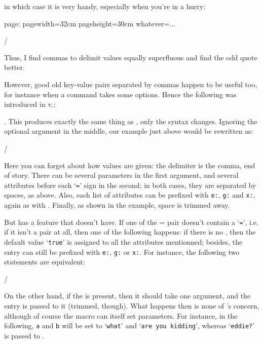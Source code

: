 \noindent in which case it is very handy, especially when you're in a hurry:

\example
\setparameter page: pagewidth=32cm pageheight=30cm whatever=\foo...\par
\example/

\noindent Thus, I find commas to delimit values equally superfluous and find
the odd quote better.

However, good old key-value pairs separated by commas happen to be useful
too, for instance when a command takes some options. Hence the following
was introduced in v.\yaxversion:

\describe*\setparameterlist\paralist{}.
This produces exactly the same thing as \com\setparameter, only the syntax
changes. Ignoring the optional argument in the middle, our example just above
would be rewritten as:

\example
{}
\example/

\noindent Here you can forget about how values are given: the delimiter is
the comma, end of story. There can be several parameters in the first argument,
and several attributes before each `\verb"="' sign in the second; in both cases,
they are separated by spaces, as above. Also, each list of attributes can be
prefixed with \verb"e:", \verb"g:" and \verb"x:", again as with \com\setparameter.
Finally, as shown in the example, space is trimmed away.

But \com\setparameterlist has a feature that \com\setparameter doesn't have.
If one of the \attr = \value pair doesn't contain a `\verb"="', i.e. if it
isn't a pair at all, then one of the following happens: if there is no
, then the default value `\verb"true"' is assigned to
all the attributes mentionned; besides, the entry can still be prefixed with
\verb"e:", \verb"g:" or \verb"x:". For instance, the following two statements
are equivalent:

\example
{}
\example/

On the other hand, if the  is present, then it should
take one argument, and the entry is passed to it (trimmed, though). What
happens then is none of \yax's concern, although of course the macro can
itself set parameters.  For instance, in the following, \verb"a" and \verb"b"
will be set to `\verb"what"' and `\verb"are you kidding"', whereas `\verb"eddie?"'
is passed to \com\dosomething.


